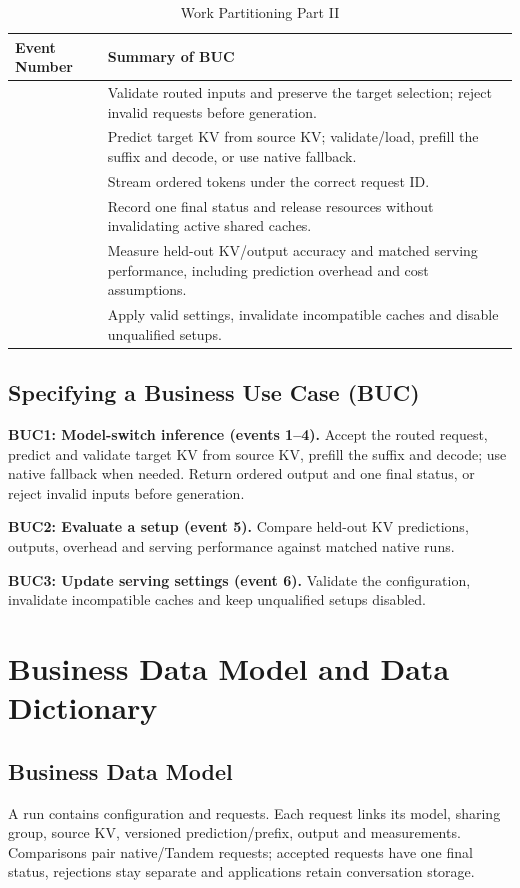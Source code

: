 \documentclass[12pt]{article}
\begin{document}
\begin{longtable}{|>{\centering\arraybackslash}p{}|>{\centering\arraybackslash}p{}|}
\caption{Work Partitioning Part II}\label{tab:work-partitioning-bucs}\\
\hline
\textbf{Event Number} & \textbf{Summary of BUC}\\
\hline
\endhead
1 & Validate routed inputs and preserve the target selection; reject invalid requests before generation.\\
\hline
2 & Predict target KV from source KV; validate/load, prefill the suffix and decode, or use native fallback.\\
\hline
3 & Stream ordered tokens under the correct request ID.\\
\hline
4 & Record one final status and release resources without invalidating active shared caches.\\
\hline
5 & Measure held-out KV/output accuracy and matched serving performance, including prediction overhead and cost assumptions.\\
\hline
6 & Apply valid settings, invalidate incompatible caches and disable unqualified setups.\\
\hline
\end{longtable}
\endgroup

\subsection{Specifying a Business Use Case (BUC)}
\textbf{BUC1: Model-switch inference (events 1--4).} Accept the routed request,
predict and validate target KV from source KV, prefill the suffix and decode;
use native fallback when needed. Return ordered output and one final status,
or reject invalid inputs before generation.

\textbf{BUC2: Evaluate a setup (event 5).} Compare held-out KV predictions,
outputs, overhead and serving performance against matched native runs.

\textbf{BUC3: Update serving settings (event 6).} Validate the configuration,
invalidate incompatible caches and keep unqualified setups disabled.


\section{Business Data Model and Data Dictionary}


\subsection{Business Data Model}
A run contains configuration and requests. Each request links its model,
sharing group, source KV, versioned prediction/prefix, output and measurements.
Comparisons pair native/Tandem requests; accepted requests have one final
status, rejections stay separate and applications retain conversation storage.
\end{document}
